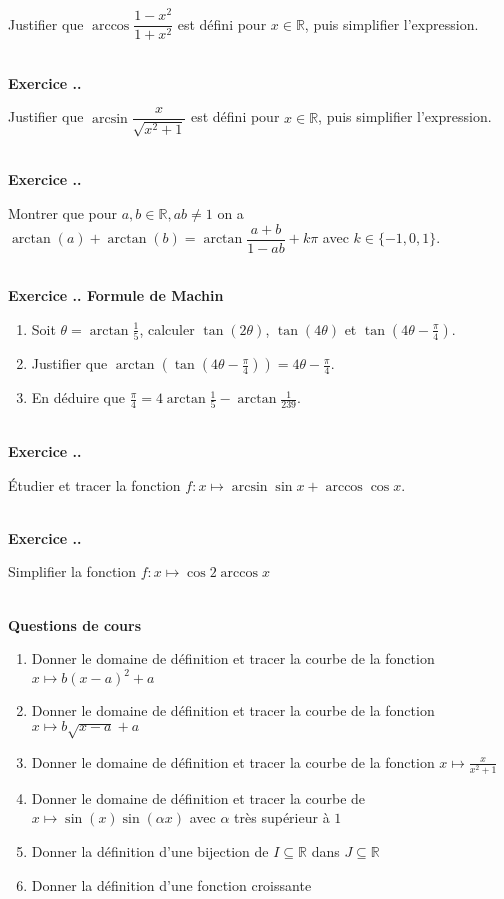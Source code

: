 \documentclass{article}
\newcommand{\ds}{\vspace{0.4\baselineskip}}
\newcommand{\mb}[1]{\mathbb{#1}}
\newcounter{exo}
\newcommand{\exercice}[1][\null]{\textbf{\\ Exercice \thesection.\theexo. #1} \addtocounter{exo}{1}}
\newcommand{\cours}{\textbf{\ds \\ \large Questions de cours}}
\begin{document}
Justifier que $\arccos \dfrac{1-x^2}{1+x^2}$ est défini pour $x \in \mb{R}$, puis simplifier l'expression.

\exercice

Justifier que $\arcsin \dfrac{x}{\sqrt{x^2 +1}}$ est défini pour $x \in \mb{R}$, puis simplifier l'expression.




\exercice

Montrer que pour $a,b \in \mb{R}, ab \neq 1$ on a $\arctan(a) + \arctan(b) = \arctan \dfrac{a+b}{1-ab} + k \pi$ avec $k \in \{ -1, 0, 1 \}$.


\exercice[Formule de Machin]

\begin{enumerate} 

\item Soit $\theta = \arctan \frac{1}{5}$, calculer $\tan(2\theta)$, $\tan(4 \theta)$ et $\tan(4 \theta - \frac{\pi}{4})$.

\item Justifier que $\arctan(\tan(4 \theta-\frac{\pi}{4})) = 4 \theta-\frac{\pi}{4}$.

\item En déduire que $\displaystyle \frac{\pi}{4} = 4 \arctan\frac{1}{5} -  \arctan\frac{1}{239}$.

\end{enumerate}

\exercice 

Étudier et tracer la fonction $f : x \mapsto \arcsin \sin x + \arccos \cos x$.

\exercice 

Simplifier la fonction $f : x \mapsto \cos 2 \arccos x$




\cours 

\begin{enumerate}
    \item Donner le domaine de définition et tracer 
        la courbe de la fonction $x \mapsto b (x - a)^2 + a$

    \item Donner le domaine de définition et tracer 
        la courbe de la fonction $x \mapsto b \sqrt{x - a} + a$

    \item Donner le domaine de définition et tracer 
        la courbe de la fonction $x \mapsto \frac{x}{x^2 + 1}$


    \item Donner le domaine de définition et tracer la courbe 
        de $x \mapsto \sin(x) \sin (\alpha x)$ avec $\alpha$ très
        supérieur à $1$

    \item Donner la définition d'une bijection de $I \subseteq \mb{R}$
        dans $J \subseteq \mb{R}$

    \item Donner la définition d'une fonction croissante 
\end{enumerate}
\end{document}
